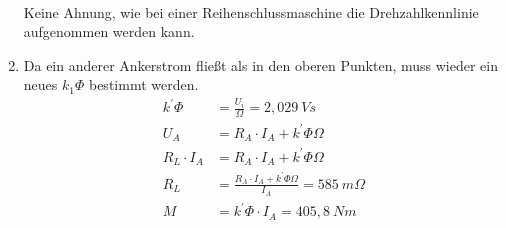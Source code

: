 \begin{solution}
\begin{enumerate}
\begin{align}
\end{align}
Keine Ahnung, wie bei einer Reihenschlussmaschine die Drehzahlkennlinie aufgenommen werden kann.
\item Da ein anderer Ankerstrom fließt als in den oberen Punkten, muss wieder ein neues $k_1 \Phi$ bestimmt werden.
\begin{align}
k^{'} \Phi &= \frac{U_i}{\Omega} = 2,029~Vs\\
U_A &= R_A \cdot I_A + k^{'} \Phi \Omega\\
R_L \cdot I_A &= R_A \cdot I_A + k^{'} \Phi \Omega\\
R_L &= \frac{R_A \cdot I_A + k^{'} \Phi \Omega}{I_A}=585~m\Omega\\
M &= k^{'} \Phi \cdot I_A = 405,8~Nm
\end{align}
\end{enumerate}
\end{solution}